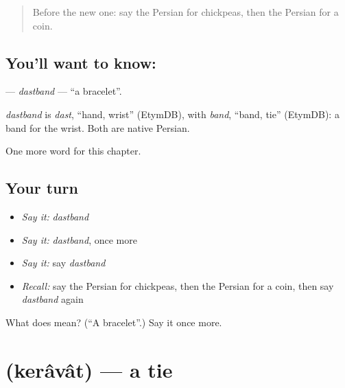 \label{lesson:FA-C119-dastband}



\begin{quote}
Before the new one: say the Persian for chickpeas, then the Persian for a coin.
\end{quote}

\subsection*{You'll want to know: }
\textbf{} — \emph{dastband} — \textquotedblleft{}a bracelet\textquotedblright{}.

\begin{cousinweb}
\emph{dastband} is \emph{dast}, \textquotedblleft{}hand, wrist\textquotedblright{} (EtymDB), with \emph{band}, \textquotedblleft{}band, tie\textquotedblright{} (EtymDB): a band for the wrist. Both are native Persian.
\end{cousinweb}

\begin{grammarlens}[title={What you've built}]
One more word for this chapter.
\end{grammarlens}

\subsection*{Your turn}
\begin{itemize}
\raggedright
  \item \emph{Say it:} \emph{dastband}
  \item \emph{Say it:} \emph{dastband}, once more
  \item \emph{Say it:} say \emph{dastband}
  \item \emph{Recall:} say the Persian for chickpeas, then the Persian for a coin, then say \emph{dastband} again
\end{itemize}

\begin{tcolorbox}[breakable,colback=teal!4,colframe=teal!35!black,title={Before you move on}]
What does  mean? (\textquotedblleft{}A bracelet\textquotedblright{}.) Say it once more.
\end{tcolorbox}
\section[\texorpdfstring{\fa{کراوات} (kerâvât)}{کراوات (kerâvât)}]{ (kerâvât) — a tie}

